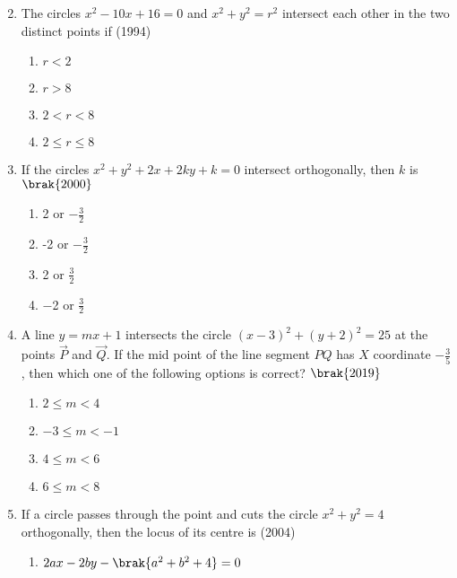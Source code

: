 \begin{enumerate}
\begin{multicols}{4}
\end{multicols}
    \item The circles $x^{2}-10x+16=0$ and $x^{2}+y^{2}=r^{2}$ intersect each other in the two distinct points if
    \hfill {(1994)}
    \begin{multicols}{4}
\begin{enumerate}
    	\item $r<2$
    	\item $r>8$
    	\item $2<r<8$
    	\item $2\leq r\leq8$
    \end{enumerate}
\end{multicols}
     \item If the circles $x^2+y^2+2x+2ky+k=0$ intersect orthogonally, then $k$ is
        \hfill$\brak{2000}$
    \begin{multicols}{4}
\begin{enumerate}
        \item 2 or $-\frac{3}{2}$
        \item -2 or $-\frac{3}{2}$
        \item 2 or $\frac{3}{2}$
        \item $-$2 or $\frac{3}{2}$
    \end{enumerate}
    \end{multicols}
             \item A line $y=mx+1$ intersects the circle $(x-3)^2+(y+2)^2=25$ at the points $\vec{P}$ and $\vec{Q}$. If the mid point of the line segment $PQ$ has $X$ coordinate $-\frac{3}{5}$,  then which one of the following options is correct?
                 \hfill$\brak{ 2019}$
                 \begin{multicols}{4}
\begin{enumerate}
                 \item $2\le m<4$
                 \item $-3\le m<-1$
                 \item $4\le m<6$
                 \item $6\le m<8$
             \end{enumerate}
\end{multicols}
\item If a circle passes through the point  and cuts the circle $x^2+y^2=4$ orthogonally,  then the locus of its centre is
\hfill{(2004)}
\begin{multicols}{2}
\begin{enumerate}
\item $2ax-2by-\brak{a^2+b^2+4}=0$

\end{enumerate}
\end{multicols}
\end{enumerate}
